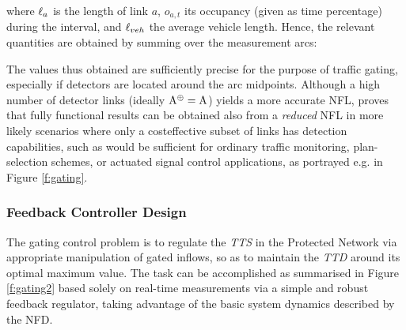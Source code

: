 
where $\ell_a$ is the length of link $a$, $o_{a,t}$ its occupancy (given as time percentage) during the interval, and $\ell_{veh}$ the average vehicle length. Hence, the relevant quantities are obtained by summing over the measurement arcs:



The values thus obtained are sufficiently precise for the purpose of traffic gating, especially if
detectors are located around the arc midpoints. Although a high number of detector links
(ideally $\mathrm{A}^\oplus = \mathrm{A}$) yields a more accurate NFL, \citep{keyvan2013urban} proves that fully functional results can be obtained also from a \emph{reduced} NFL in more likely scenarios where only a costeffective subset of links has detection capabilities, such as would be sufficient for ordinary traffic monitoring, plan-selection schemes, or actuated signal control applications, as portrayed e.g. in Figure \ref{f:gating}.

\subsubsection{Feedback Controller Design}
\newcommand{\qg}{\flow^{g}}
\newcommand{\qe}{\flow^{\epsilon}}
\newcommand{\qin}{\flow^{\scriptscriptstyle{IN}}}
\newcommand{\qout}{\flow^{\scriptscriptstyle{OUT}}}
\newcommand{\roin}{\rho^{\scriptscriptstyle{IN}}}
\newcommand{\npn}{n_{\scriptscriptstyle{PN}}}

The gating control problem is to regulate the \emph{TTS} in the Protected Network via appropriate manipulation of gated inflows, so as to maintain the \emph{TTD} around its optimal maximum value. The task can be accomplished as summarised in Figure \ref{f:gating2} based solely on real-time measurements via a simple and robust feedback regulator, taking advantage of the basic system dynamics described by the NFD.



